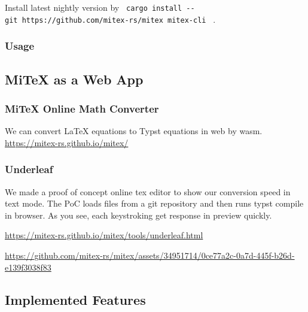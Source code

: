 Install latest nightly version by
\texttt{\ cargo\ install\ -\/-git\ https://github.com/mitex-rs/mitex\ mitex-cli\ }
.

\subsubsection{Usage}\label{usage}

\begin{Shaded}
\begin{Highlighting}[]
\end{Highlighting}
\end{Shaded}

\subsection{MiTeX as a Web App}\label{mitex-as-a-web-app}

\subsubsection{MiTeX Online Math
Converter}\label{mitex-online-math-converter}

We can convert LaTeX equations to Typst equations in web by wasm.
\url{https://mitex-rs.github.io/mitex/}

\subsubsection{Underleaf}\label{underleaf}

We made a proof of concept online tex editor to show our conversion
speed in text mode. The PoC loads files from a git repository and then
runs typst compile in browser. As you see, each keystroking get response
in preview quickly.

\url{https://mitex-rs.github.io/mitex/tools/underleaf.html}

\url{https://github.com/mitex-rs/mitex/assets/34951714/0ce77a2c-0a7d-445f-b26d-e139f3038f83}

\subsection{Implemented Features}\label{implemented-features}


